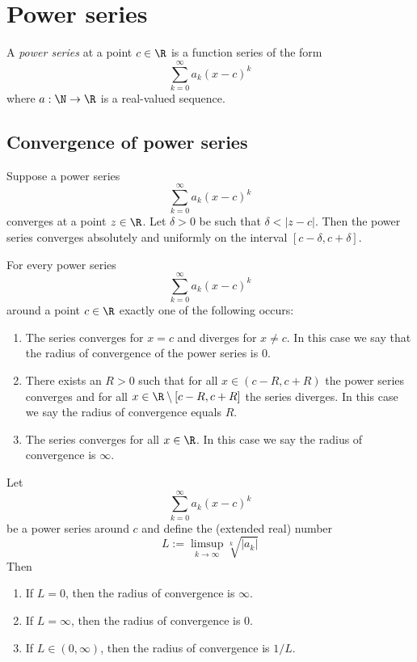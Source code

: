 \section{Power series}
\begin{definition}
    A \emph{power series} at a point $c \in \R$ is a function series of the form
    $$\sum_{k=0}^\infty a_k(x-c)^k$$
    where $a: \N \to \R$ is a real-valued sequence.
\end{definition}

\subsection{Convergence of power series}
\begin{lemma}
    Suppose a power series
    $$\sum_{k=0}^\infty a_k(x-c)^k$$
    converges at a point $z \in \R$. Let $\delta > 0$ be such that $\delta < |z-c|$.
    Then the power series converges absolutely and uniformly on the interval $[c-\delta, c + \delta]$.
\end{lemma}

\begin{corollary}
    For every power series
    $$\sum_{k=0}^\infty a_k(x-c)^k$$
    around a point $c \in \R$ exactly one of the following occurs:
    \begin{enumerate}[label=\roman*]
        \item The series converges for $x = c$ and diverges for $x \ne c$. In this case
            we say that the radius of convergence of the power series is 0.
        \item There exists an $R > 0$ such that for all $x \in (c-R, c+R)$ the power
            series converges and for all $x \in \R \setminus [c-R,c+R]$ the series diverges.
            In this case we say the radius of convergence equals $R$.
        \item The series converges for all $x \in \R$. In this case we say the radius of
            convergence is $\infty$.
    \end{enumerate}
\end{corollary}

\begin{proposition}
    Let 
    $$\sum_{k=0}^\infty a_k(x-c)^k$$
    be a power series around $c$ and define the (extended real) number
    $$L := \limsup_{k \to \infty}\sqrt[k]{|a_k|}$$
    Then
    \begin{enumerate}[label=\roman*]
        \item If $L = 0$, then the radius of convergence is $\infty$.
        \item If $L = \infty$, then the radius of convergence is 0.
        \item If $L \in (0,\infty)$, then the radius of convergence is $1/L$.
    \end{enumerate}
\end{proposition}

